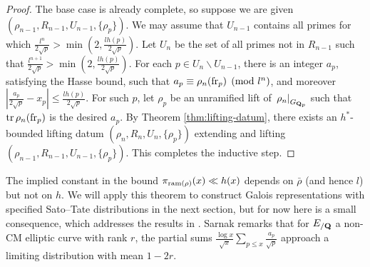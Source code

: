 \begin{proof}
The base case is already complete, so suppose we are given 
$(\rho_{n-1},R_{n-1},U_{n-1},\{\rho_p\})$. We may assume that $U_{n-1}$ 
contains all primes for 
which $\frac{l^n}{2\sqrt p} > \min\left(2, \frac{l h(p)}{2\sqrt p}\right)$. Let 
$U_n$ be the set of all primes not in $R_{n-1}$ such that 
$\frac{l^{n+1}}{2\sqrt p} > \min\left(2, \frac{l h(p)}{2\sqrt p}\right)$. For 
each $p\in U_n\smallsetminus U_{n-1}$, there is an integer $a_p$, satisfying 
the Hasse bound, such that $a_p\equiv \rho_n(\mathrm{fr}_p)\pmod{l^n}$, and moreover 
$\left|\frac{a_p}{2\sqrt p} - x_p\right| \leqslant \frac{l h(p)}{2\sqrt p}$. 
For such $p$, let $\rho_p$ be an unramified lift of 
$\left. \rho_n\right|_{G_{\mathbf{Q}_p}}$ such that $\operatorname{tr}\rho_n(\mathrm{fr}_p)$ is the 
desired $a_p$. By Theorem \ref{thm:lifting-datum}, there exists an 
$h^\ast$-bounded lifting datum $(\rho_n,R_n,U_n,\{\rho_p\})$ extending and 
lifting $(\rho_{n-1},R_{n-1},U_{n-1},\{\rho_p\})$. This completes the inductive 
step.  
\end{proof}

The implied constant in the bound $\pi_{\mathrm{ram}(\rho)}(x)\ll h(x)$ depends on 
$\bar\rho$ (and hence $l$) but not on $h$. 
We will apply this theorem to construct Galois representations with specified 
Sato--Tate distributions in the next section, but for now here is a small 
consequence, which addresses the results in \cite{sarnak-2007}. Sarnak remarks 
that for $E_{/\mathbf{Q}}$ a non-CM elliptic curve with rank $r$, the partial sums 
$\frac{\log x}{\sqrt x} \sum_{p\leqslant x} \frac{a_p}{\sqrt p}$ approach a 
limiting distribution with mean $1 - 2 r$. 

